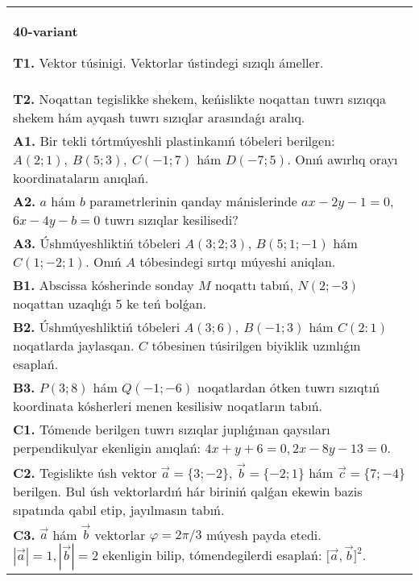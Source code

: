 \documentclass{article}
\begin{document}
\begin{tabular}{m{17cm}}
\textbf{40-variant}

\textbf{T1.} 
Vektor túsinigi. Vektorlar ústindegi sızıqlı ámeller.
 \\
\textbf{T2.} 
Noqattan tegislikke shekem, keńislikte noqattan tuwrı sızıqqa shekem hám ayqash tuwrı sızıqlar arasındaǵı aralıq.
 \\
\textbf{A1.} 
Bir tekli tórtmúyeshli plastinkanıń tóbeleri berilgen:
$A (2;1), \ B (5;3), \ C (-1;7) $ hám $D (-7;5) $. Onıń awırlıq orayı
koordinataların anıqlań.
 \\
\textbf{A2.} 
$a$ hám $b$ parametrlerinin qanday mánislerinde
$ax-2y-1=0$, $6x-4y-b=0$ tuwrı sızıqlar kesilisedi?
 \\
\textbf{A3.} 
Úshmúyeshliktiń tóbeleri
$A (3;2; 3) $, $B (5;1; - 1) $ hám $C (1; -2;1) $. Onıń $A$ tóbesindegi sırtqı múyeshi aniqlan.
 \\
\textbf{B1.} 
Abscissa kósherinde sonday $M$ noqattı tabıń,
\(N (2;-3) \) noqattan uzaqlıǵı 5 ke teń bolǵan.
 \\
\textbf{B2.} 
Úshmúyeshliktiń tóbeleri \(A (3;6),\ B (-1;3) \) hám
\(C (2: 1) \) noqatlarda jaylasqan. $C$ tóbesinen túsirilgen biyiklik uzınlıǵın esaplań.
 \\
\textbf{B3.} 
\(P (3;8) \) hám \(Q (-1;-6) \) noqatlardan ótken
tuwrı sızıqtıń koordinata kósherleri menen kesilisiw noqatların tabıń.
 \\
\textbf{C1.} 
Tómende berilgen tuwrı sızıqlar juplıǵınan qaysıları
perpendikulyar ekenligin anıqlań: $4x+y+6=0, 2x-8y-13=0$.
 \\
\textbf{C2.} 
Tegislikte úsh vektor $\vec{a} = \{ 3; - 2\}$, $\vec{b} = \{ - 2;1\}$ hám $\vec{c} = \{ 7; - 4\}$ berilgen. Bul úsh vektorlardıń hár biriniń qalǵan ekewin bazis sıpatında qabıl etip, jayılmasın tabıń.
 \\
\textbf{C3.} 
$\vec{a}$ hám $\vec{b}$ vektorlar $\varphi = 2\pi/3$ múyesh payda etedi. $|\vec{a}| = 1,|\vec{b}| = 2$ ekenligin bilip, tómendegilerdi esaplań:
$\lbrack\vec{a},\vec{b}\rbrack^{2}$.
 \\

\end{tabular}
\vspace{1cm}
\end{document}
